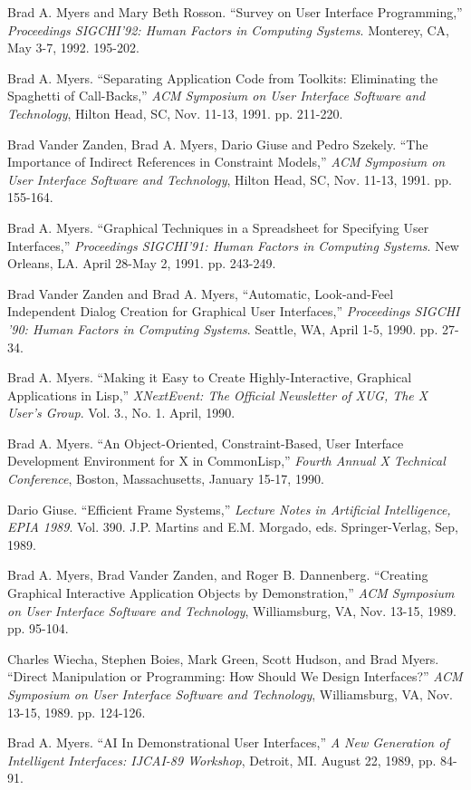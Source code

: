Brad A. Myers and Mary Beth Rosson.  ``Survey on User Interface
Programming,'' {\it Proceedings SIGCHI'92: Human Factors in Computing
Systems}.  Monterey, CA, May 3-7, 1992.  195-202.

Brad A. Myers. ``Separating Application Code from Toolkits:
Eliminating the Spaghetti of Call-Backs,'' {\it ACM Symposium on User
Interface Software and Technology}, Hilton Head, SC, Nov. 11-13, 1991.
pp. 211-220.

Brad Vander Zanden, Brad A. Myers, Dario Giuse and Pedro Szekely.
``The Importance of Indirect References in Constraint Models,'' {\it ACM
Symposium on User Interface Software and Technology}, Hilton Head, SC,
Nov. 11-13, 1991. pp. 155-164.

Brad A. Myers.  ``Graphical Techniques in a Spreadsheet for Specifying
User Interfaces,'' {\it Proceedings SIGCHI'91: Human Factors in
Computing Systems}.  New Orleans, LA.  April 28-May 2, 1991.  pp.
243-249.

Brad Vander Zanden and Brad A. Myers, ``Automatic, Look-and-Feel
Independent Dialog Creation for Graphical User Interfaces,''
{\it Proceedings SIGCHI '90: Human Factors in Computing Systems}.
Seattle, WA, April 1-5, 1990. pp. 27-34.

Brad A. Myers.  ``Making it Easy to Create Highly-Interactive,
Graphical Applications in Lisp,'' {\it XNextEvent: The Official
Newsletter of XUG, The X User's Group}.  Vol. 3., No. 1. April, 1990.

Brad A. Myers. ``An Object-Oriented, Constraint-Based, User Interface
Development Environment for X in CommonLisp,'' {\it Fourth Annual X
Technical Conference}, Boston, Massachusetts, January 15-17, 1990.

Dario Giuse. ``Efficient Frame Systems,'' {\it Lecture Notes in
Artificial Intelligence, EPIA 1989}.  Vol. 390. J.P. Martins and E.M.
Morgado, eds.  Springer-Verlag, Sep, 1989.

Brad A. Myers, Brad Vander Zanden, and Roger B. Dannenberg. ``Creating
Graphical Interactive Application Objects by Demonstration,'' {\it ACM
Symposium on User Interface Software and Technology}, Williamsburg,
VA, Nov. 13-15, 1989. pp. 95-104.

Charles Wiecha, Stephen Boies, Mark Green, Scott Hudson, and Brad
Myers.  ``Direct Manipulation or Programming: How Should We Design
Interfaces?''  {\it ACM Symposium on User Interface Software and
Technology}, Williamsburg, VA, Nov. 13-15, 1989. pp. 124-126.

Brad A. Myers. ``AI In Demonstrational User Interfaces,'' {\it A New
Generation of Intelligent Interfaces: IJCAI-89 Workshop}, Detroit, MI.
August 22, 1989, pp. 84-91.

